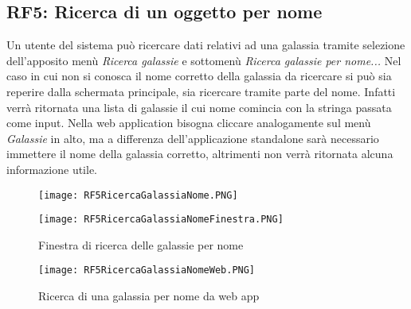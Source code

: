 \documentclass[12pt,a4paper,onecolumn,x11names]{article}
\begin{document}
	\subsection{RF5: Ricerca di un oggetto per nome}
		\begin{flushleft}
			Un utente del sistema può ricercare dati relativi ad una galassia tramite selezione dell'apposito menù \textit{Ricerca galassie} e sottomenù \textit{Ricerca galassie per nome...} Nel caso in cui non si conosca il nome corretto della galassia da ricercare si può sia reperire dalla schermata principale, sia ricercare tramite parte del nome. Infatti verrà ritornata una lista di galassie il cui nome comincia con la stringa passata come input.\newline
			Nella web application bisogna cliccare analogamente sul menù \textit{Galassie} in alto, ma a differenza dell'applicazione standalone sarà necessario immettere il nome della galassia corretto, altrimenti non verrà ritornata alcuna informazione utile.
			\begin{figure}[!h]
				\centering
				\begin{minipage}[c]{.45\textwidth}
					\texttt{[image: RF5RicercaGalassiaNome.PNG]}
					\caption{Menù ricerca galassie\newline per nome}
				\end{minipage}%
				\centering
				\begin{minipage}[c]{.45\textwidth}
					\texttt{[image: RF5RicercaGalassiaNomeFinestra.PNG]}
					\caption{Finestra di ricerca delle galassie per nome}
				\end{minipage}%
			\end{figure}
			\begin{figure}[h]
				\centering
				\texttt{[image: RF5RicercaGalassiaNomeWeb.PNG]}
				\caption{Ricerca di una galassia per nome da web app}
			\end{figure}
		\end{flushleft}
\end{document}

